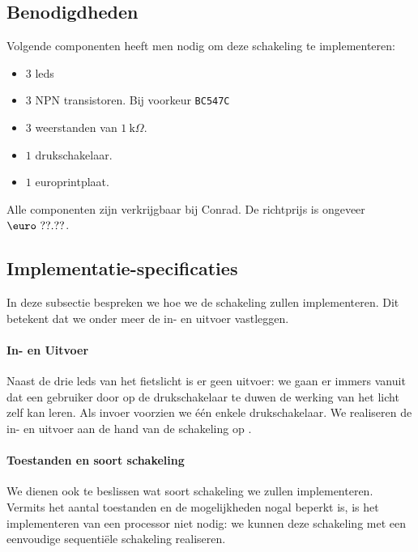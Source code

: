 \subsection{Benodigdheden}
Volgende componenten heeft men nodig om deze schakeling te implementeren:
\begin{itemize}
 \item $3$ leds
 \item $3$ NPN transistoren. Bij voorkeur \verb+BC547C+
 \item $3$ weerstanden van $1~\mbox{k}\Omega$.
 \item $1$ drukschakelaar.
 \item $1$ europrintplaat.
\end{itemize}
Alle componenten zijn verkrijgbaar bij Conrad. De richtprijs is ongeveer $\mbox{\euro}\ ??.??$.
\subsection{Implementatie-specificaties}
In deze subsectie bespreken we hoe we de schakeling zullen implementeren. Dit betekent dat we onder meer de in- en uitvoer vastleggen.
\paragraph{In- en Uitvoer}
Naast de drie leds van het fietslicht is er geen uitvoer: we gaan er immers vanuit dat een gebruiker door op de drukschakelaar te duwen de werking van het licht zelf kan leren. Als invoer voorzien we \'e\'en enkele drukschakelaar. We realiseren de in- en uitvoer aan de hand van de schakeling op .
\paragraph{Toestanden en soort schakeling}
We dienen ook te beslissen wat soort schakeling we zullen implementeren. Vermits het aantal toestanden en de mogelijkheden nogal beperkt is, is het implementeren van een processor niet nodig: we kunnen deze schakeling met een eenvoudige sequenti\"ele schakeling realiseren.
